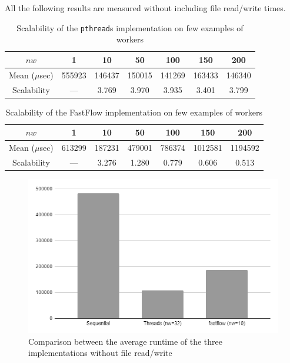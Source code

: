 \documentclass[10pt]{article}
\begin{document}
All the following results are measured without including file read/write times.
\begin{table}[H]
\begin{center}
	\begin{tabular}{c || c c c c c c}
	$nw$ & 1 & 10 & 50 & 100 & 150 & 200\\
	\hline
	Mean ($\mu$sec) & 555923 & 146437 & 150015 & 141269 & 163433 & 146340\\
	\hline
	Scalability & --- & 3.769 & 3.970 & 3.935 & 3.401 & 3.799
	\end{tabular}
\end{center}
\caption{Scalability of the \texttt{pthread}s implementation on few examples of workers}
\label{table:scalability_threads}
\end{table}
\begin{table}[H]
\begin{center}
	\begin{tabular}{c || c c c c c c}
	$nw$ & 1 & 10 & 50 & 100 & 150 & 200\\
	\hline
	Mean ($\mu$sec) & 613299 & 187231 & 479001 & 786374 & 1012581 & 1194592\\
	\hline
	Scalability & --- & 3.276 & 1.280 & 0.779 & 0.606 & 0.513
	\end{tabular}
\end{center}
\caption{Scalability of the FastFlow implementation on few examples of workers}
\label{table:scalability_fastflow}
\end{table}
\begin{figure}[H]
\begin{center}
	\includegraphics[scale=0.75]{runtimes.png}
\end{center}
\caption{Comparison between the average runtime of the three implementations without file read/write}
\label{figure:runtimes}
\end{figure}
\end{document}
